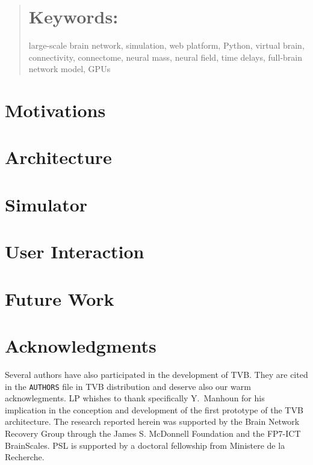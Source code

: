 \begin{abstract}
  
\section{Keywords:} large-scale brain network, simulation,  web platform, Python, virtual
brain, connectivity, connectome, neural mass, neural field, time delays,
full-brain network model, GPUs

\end{abstract}



\section{Motivations}


\section{Architecture}


\section{Simulator}


\section{User Interaction}


\section{Future Work}


\section*{Acknowledgments}
 Several authors have also participated in the development of TVB. They are cited in the
\texttt{AUTHORS} file in TVB distribution and deserve also our warm acknowlegments. LP whishes to thank specifically Y.~Manhoun for his implication in the conception and development of the first prototype of the TVB architecture. The research reported herein was supported by the  Brain Network Recovery Group through the James S. McDonnell Foundation and the FP7-ICT BrainScales. PSL is supported by a doctoral fellowship from Ministere de la Recherche.






